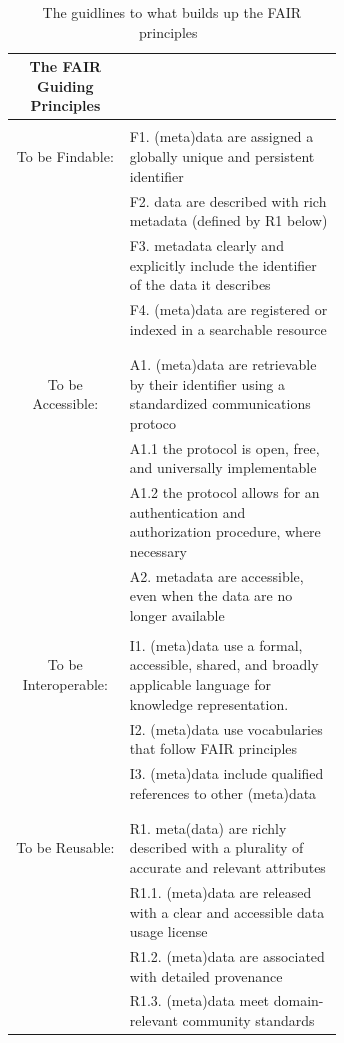 \documentclass{report}
\begin{document}
\begin{table}[h!]
    \begin{center}
    \label{tab:FAIR}
        \begin{tabular}{c|p{0.65\linewidth}}
        The FAIR Guiding Principles\\
        \hline
        \\
        To be Findable: & F1. (meta)data are assigned a globally unique and persistent identifier\\
        & F2. data are described with rich metadata (defined by R1 below)\\ & F3. metadata clearly and explicitly include the identifier of the data it describes\\ & F4. (meta)data are registered or indexed in a searchable resource\\
        \\
        \hline
        \\
        To be Accessible: & A1. (meta)data are retrievable by their identifier using a standardized communications protoco\\
        & A1.1 the protocol is open, free, and universally implementable\\ & A1.2 the protocol allows for an authentication and authorization procedure, where necessary\\ & A2. metadata are accessible, even when the data are no longer available
        \\
        \hline
        \\
        To be Interoperable: & I1. (meta)data use a formal, accessible, shared, and broadly applicable language for knowledge representation.\\
        & I2. (meta)data use vocabularies that follow FAIR principles\\ & I3. (meta)data include qualified references to other (meta)data\\
        \\
        \hline
        \\
        To be Reusable: & R1. meta(data) are richly described with a plurality of accurate and relevant attributes\\
        & R1.1. (meta)data are released with a clear and accessible data usage license\\ & R1.2. (meta)data are associated with detailed provenance\\ &
        R1.3. (meta)data meet domain-relevant community standards\\
        \end{tabular}
        \caption{\label{Fair}The guidlines to what builds up the FAIR principles~\cite{wilkinson_fair_2016}}
    \end{center}
\end{table}
\end{document}
